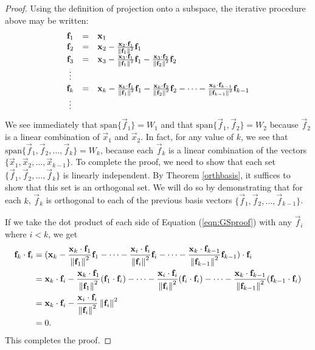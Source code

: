 \documentclass{ximera}
\begin{document}
\begin{theorem}
\begin{proof}
Using the definition of projection onto a subspace, the iterative procedure above may be written:
\begin{equation}\label{eqn:GSproof}
\begin{array}{ccl}
\mathbf{f}_{1} &=& \mathbf{x}_{1} \\
\mathbf{f}_{2} &=& \mathbf{x}_{2} - \frac{\mathbf{x}_{2} \cdot \mathbf{f}_{1}}{\left\lVert\mathbf{f}_{1}\right\rVert^2}\mathbf{f}_{1} \\
\mathbf{f}_{3} &=& \mathbf{x}_{3} - \frac{\mathbf{x}_{3} \cdot \mathbf{f}_{1}}{\left\lVert\mathbf{f}_{1}\right\rVert^2}\mathbf{f}_{1} - \frac{\mathbf{x}_{3} \cdot \mathbf{f}_{2}}{\left\lVert\mathbf{f}_{2}\right\rVert^2}\mathbf{f}_{2} \\
\vdots &&\\
\mathbf{f}_{k} &=& \mathbf{x}_{k} - \frac{\mathbf{x}_{k} \cdot \mathbf{f}_{1}}{\left\lVert\mathbf{f}_{1}\right\rVert^2}\mathbf{f}_{1} - \frac{\mathbf{x}_{k} \cdot \mathbf{f}_{2}}{\left\lVert\mathbf{f}_{2}\right\rVert^2}\mathbf{f}_{2} - \dots -\frac{\mathbf{x}_{k} \cdot \mathbf{f}_{k-1}}{\left\lVert\mathbf{f}_{k-1}\right\rVert^2}\mathbf{f}_{k-1} \\
\vdots &&
\end{array}
\end{equation}
We see immediately that $\mbox{span}\{\vec{f}_{1}\}=W_1$ and that $\mbox{span}\{\vec{f}_{1},\vec{f}_{2}\}=W_2$ because $\vec{f}_{2}$ is a linear combination of $\vec{x}_{1}$ and $\vec{x}_{2}$.  In fact, for any value of $k$, we see that $\mbox{span}\{\vec{f}_{1},\vec{f}_{2},\ldots,\vec{f}_{k}\}=W_k$, because each $\vec{f}_{k}$ is a linear combination of the vectors $\{\vec{x}_{1},\vec{x}_{2},\ldots,\vec{x}_{k-1}\}$.
To complete the proof, we need to show that each set $\{\vec{f}_{1},\vec{f}_{2},\ldots,\vec{f}_{k}\}$ is linearly independent.  By Theorem \ref{orthbasis}, it suffices to show that this set is an orthogonal set.  We will do so by demonstrating that for each $k$, $\vec{f}_{k}$ is orthogonal to each of the previous basis vectors $\{\vec{f}_{1},\vec{f}_{2},\ldots,\vec{f}_{k-1}\}$.

If we take the dot product of each side of Equation (\ref{eqn:GSproof}) with any $\vec{f}_{i}$ where $i<k$, we get
\begin{align*}
\mathbf{f}_{k} \cdot \mathbf{f}_{i}
&= (\mathbf{x}_k - \frac{\mathbf{x}_{k} \cdot \mathbf{f}_{1}}{\left\lVert\mathbf{f}_{1}\right\rVert^2}\mathbf{f}_{1} - \dots -\frac{\mathbf{x}_{i} \cdot \mathbf{f}_{i}}{\left\lVert\mathbf{f}_{i}\right\rVert^2}\mathbf{f}_{i} - \dots -\frac{\mathbf{x}_{k} \cdot \mathbf{f}_{k-1}}{\left\lVert\mathbf{f}_{k-1}\right\rVert^2}\mathbf{f}_{k-1}) \cdot \mathbf{f}_{i} \\
&= \mathbf{x}_k \cdot \mathbf{f}_{i} - \frac{\mathbf{x}_{k} \cdot \mathbf{f}_{1}}{\left\lVert\mathbf{f}_{1}\right\rVert^2}(\mathbf{f}_{1} \cdot \mathbf{f}_{i}) - \dots -\frac{\mathbf{x}_{i} \cdot \mathbf{f}_{i}}{\left\lVert\mathbf{f}_{i}\right\rVert^2}(\mathbf{f}_{i} \cdot \mathbf{f}_{i}) - \dots -\frac{\mathbf{x}_{k} \cdot \mathbf{f}_{k-1}}{\left\lVert\mathbf{f}_{k-1}\right\rVert^2}(\mathbf{f}_{k-1} \cdot \mathbf{f}_{i}) \\
&= \mathbf{x}_k \cdot \mathbf{f}_{i} - \frac{\mathbf{x}_{i} \cdot \mathbf{f}_{i}}{\left\lVert\mathbf{f}_{i}\right\rVert^2} \left\lVert\mathbf{f}_{i}\right\rVert^2 \\
&= 0.
\end{align*}
This completes the proof.
\end{proof}
\end{theorem}
\end{document}
